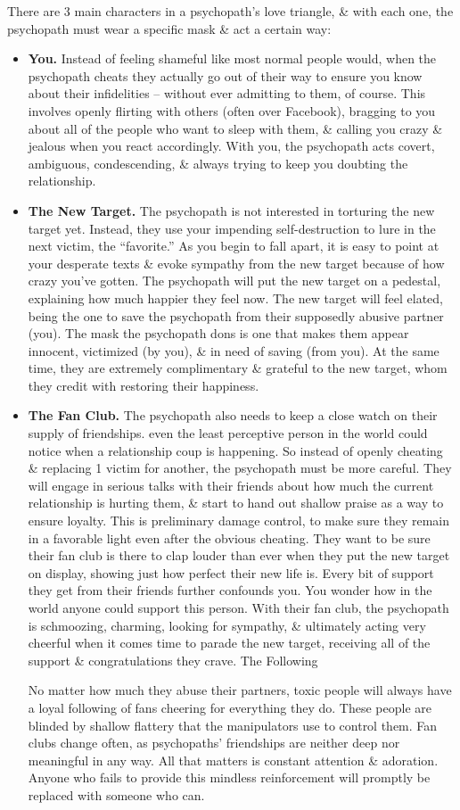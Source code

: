 \documentclass{article}
\numberwithin{equation}{section}
\begin{document}
There are 3 main characters in a psychopath's love triangle, \& with each one, the psychopath must wear a specific mask \& act a certain way:
\begin{itemize}
	\item \textbf{You.} Instead of feeling shameful like most normal people would, when the psychopath cheats they actually go out of their way to ensure you know about their infidelities -- without ever admitting to them, of course. This involves openly flirting with others (often over Facebook), bragging to you about all of the people who want to sleep with them, \& calling you crazy \& jealous when you react accordingly. With you, the psychopath acts covert, ambiguous, condescending, \& always trying to keep you doubting the relationship.
	\item \textbf{The New Target.} The psychopath is not interested in torturing the new target yet. Instead, they use your impending self-destruction to lure in the next victim, the ``favorite.'' As you begin to fall apart, it is easy to point at your desperate texts \& evoke sympathy from the new target because of how crazy you've gotten. The psychopath will put the new target on a pedestal, explaining how much happier they feel now. The new target will feel elated, being the one to save the psychopath from their supposedly abusive partner (you). The mask the psychopath dons is one that makes them appear innocent, victimized (by you), \& in need of saving (from you). At the same time, they are extremely complimentary \& grateful to the new target, whom they credit with restoring their happiness.
	\item \textbf{The Fan Club.} The psychopath also needs to keep a close watch on their supply of friendships. even the least perceptive person in the world could notice when a relationship coup is happening. So instead of openly cheating \& replacing 1 victim for another, the psychopath must be more careful. They will engage in serious talks with their friends about how much the current relationship is hurting them, \& start to hand out shallow praise as a way to ensure loyalty. This is preliminary damage control, to make sure they remain in a favorable light even after the obvious cheating. They want to be sure their fan club is there to clap louder than ever when they put the new target on display, showing just how perfect their new life is. Every bit of support they get from their friends further confounds you. You wonder how in the world anyone could support this person. With their fan club, the psychopath is schmoozing, charming, looking for sympathy, \& ultimately acting very cheerful when it comes time to parade the new target, receiving all of the support \& congratulations they crave. The Following
	
	No matter how much they abuse their partners, toxic people will always have a loyal following of fans cheering for everything they do. These people are blinded by shallow flattery that the manipulators use to control them. Fan clubs change often, as psychopaths' friendships are neither deep nor meaningful in any way. All that matters is constant attention \& adoration. Anyone who fails to provide this mindless reinforcement will promptly be replaced with someone who can.
\end{itemize}
\end{document}
